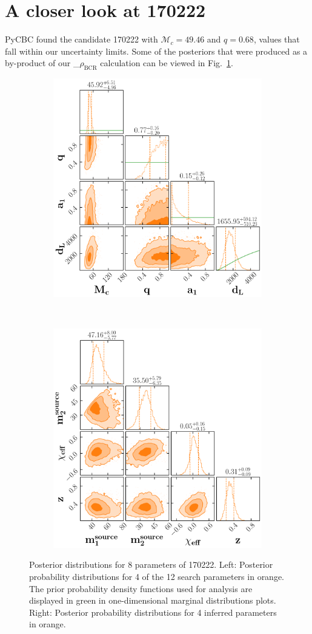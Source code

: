 \documentclass[%
 nofootinbib,
 amsmath,amssymb,
 aps,
 twocolumn,
 superscriptaddress
]{revtex4-2}
\newcommand{\mathcmd}[1]{{\sc \relax\ifmmode#1\else $#1$\fi}\xspace}
\newcommand{\bcr}{\mathcmd{\rho_\text{BCR}}}
\begin{document}



\section{A closer look at 170222}\label{apdx:170222}
PyCBC found the candidate 170222 with $\mathcal{M}_c=49.46$ and $q=0.68$, values that fall within our uncertainty limits. Some of the posteriors that were produced as a by-product of our \bcr calculation can be viewed in Fig.~\ref{fig:170222}.

\begin{figure}
    \centering
    \begin{subfigure}
        \centering
        \includegraphics[width=0.45\linewidth]{170222_prior_posterior.png}
    \end{subfigure}
    ~ 
    \begin{subfigure}
        \centering
        \includegraphics[width=0.45\linewidth]{170222_source_posterior.png}
    \end{subfigure}
    \caption{Posterior distributions for 8 parameters of 170222. 
    Left: Posterior probability distributions for 4 of the 12 search parameters in orange. The prior probability density functions used for analysis are displayed in green in one-dimensional marginal distributions plots.
    Right: Posterior probability distributions for 4 inferred parameters in orange.
    \label{fig:170222}}
\end{figure}
\end{document}
